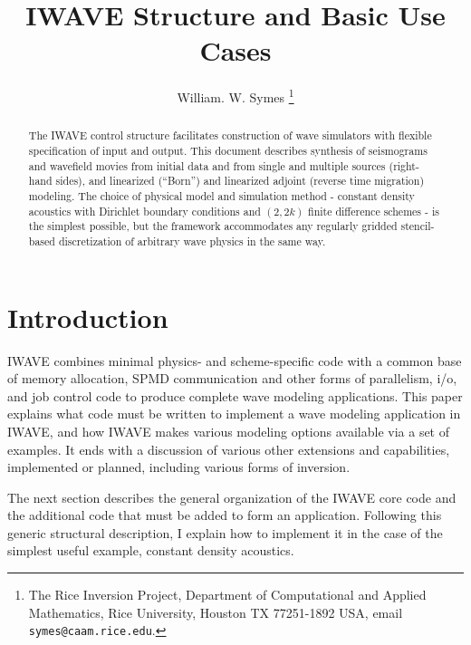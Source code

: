\title{IWAVE Structure and Basic Use Cases}
\author{William. W. Symes \thanks{The Rice Inversion Project,
Department of Computational and Applied Mathematics, Rice University,
Houston TX 77251-1892 USA, email {\tt symes@caam.rice.edu}.}}


\maketitle{}



\parskip 12pt


\begin{abstract}
  The IWAVE control structure facilitates construction of wave
  simulators with flexible specification of input and output. This
  document describes synthesis of seismograms and wavefield movies
  from initial data and from single and multiple sources (right-hand
  sides), and linearized (``Born'') and linearized adjoint
  (reverse time migration) modeling. The choice of physical model and
  simulation method - constant density acoustics with Dirichlet
  boundary conditions and $(2,2k)$ finite difference schemes - is the
  simplest possible, but the framework accommodates any regularly
  gridded stencil-based discretization of arbitrary wave physics in the same way.
\end{abstract}


\section{Introduction}
IWAVE combines minimal physics- and scheme-specific code with
a common base of memory allocation, SPMD communication and other forms
of parallelism, i/o, and
job control code to produce complete wave modeling applications. This
paper explains what code must be written to implement a wave modeling
application in IWAVE, and how IWAVE makes various modeling options
available via a set of examples. It ends with a discussion of various
other extensions and capabilities, implemented or planned, including
various forms of inversion.

The next section describes the general organization of the IWAVE core
code and the additional code that must be added to form an
application. Following this generic structural description, I explain
how to implement it in the case of the simplest useful example,
constant density acoustics.

